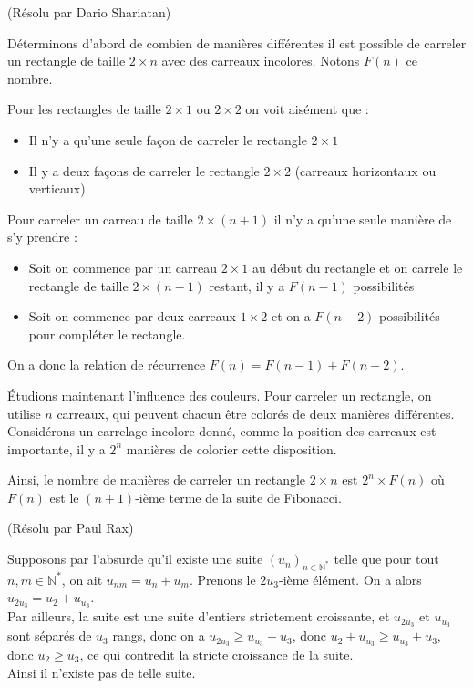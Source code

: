 \begin{sol}[75](Résolu par Dario Shariatan)

Déterminons d'abord de combien de manières différentes il est possible de carreler un rectangle de taille $2 \times n$ avec des carreaux incolores. Notons $F(n)$ ce nombre.

Pour les rectangles de taille $2 \times 1$ ou $2 \times 2$ on voit aisément que :
\begin{itemize}
\item Il n'y a qu'une seule façon de carreler le rectangle $2\times 1$
\item Il y a deux façons de carreler le rectangle $2 \times 2$ (carreaux horizontaux ou verticaux)
\end{itemize}

Pour carreler un carreau de taille $2 \times (n+1)$ il n'y a qu'une seule manière de s'y prendre :
\begin{itemize}
\item Soit on commence par un carreau $2 \times 1$ au début du rectangle et on carrele le rectangle de taille $2 \times (n-1)$ restant, il y a $F(n-1)$ possibilités
\item Soit on commence par deux carreaux $1 \times 2$ et on a $F(n-2)$ possibilités pour compléter le rectangle.
\end{itemize}

On a donc la relation de récurrence $F(n) = F(n-1) + F(n-2)$.

Étudions maintenant l'influence des couleurs. Pour carreler un rectangle, on utilise $n$ carreaux, qui peuvent chacun être colorés de deux manières différentes. Considérons un carrelage incolore donné, comme la position des carreaux est importante, il y a $2^n$ manières de colorier cette disposition. 

Ainsi, le nombre de manières de carreler un rectangle $2 \times n$ est $2^n \times F(n)$ où $F(n)$ est le $(n+1)$-ième terme de la suite de Fibonacci.

\end{sol}

\begin{sol}[78](Résolu par Paul Rax)

Supposons par l'absurde qu'il existe une suite $(u_n)_{n \in \mathbb{N}^*}$ telle que pour tout $n,m \in \mathbb{N}^*$, on ait
$u_{nm}=u_n+u_m$. Prenons le $2u_3$-i\`eme \'el\'ement. On a alors $u_{2u_3}=u_2+u_{u_3}$.\\
Par ailleurs, la suite est une suite d'entiers strictement croissante, et $u_{2u_3}$ et $u_{u_3}$ sont s\'epar\'es de $u_3$ rangs,
donc on a $u_{2u_3} \geq u_{u_3} +u_3$, donc $u_2+u_{u_3} \geq u_{u_3} +u_3$, donc $u_2 \geq u_3$, ce qui contredit la stricte croissance de la suite.\\
Ainsi il n'existe pas de telle suite.

\end{sol}

